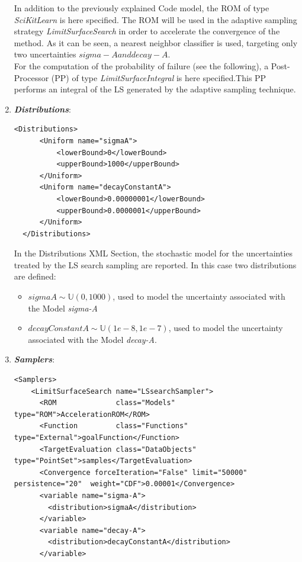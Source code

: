 \begin{enumerate}
 In addition to the previously explained Code
 model,
 the ROM of type \textit{SciKitLearn} is here specified. The ROM will be
 used in the adaptive sampling strategy \textit{LimitSurfaceSearch} in
 order to accelerate the convergence of the method. As it can be seen,
 a nearest neighbor classifier is used, targeting only two uncertainties
 $sigma-A and decay-A$.
 \\ For the computation of the probability of failure (see the following), a
 Post-Processor (PP) of type \textit{LimitSurfaceIntegral} is here
 specified.This PP performs an integral of the LS
 generated by the adaptive sampling technique.
   \item \textbf{\textit{Distributions}}:
\begin{lstlisting}[style=XML]
  <Distributions>
      <Uniform name="sigmaA">
          <lowerBound>0</lowerBound>
          <upperBound>1000</upperBound>
      </Uniform>
      <Uniform name="decayConstantA">
          <lowerBound>0.00000001</lowerBound>
          <upperBound>0.0000001</upperBound>
      </Uniform>
  </Distributions>
\end{lstlisting}
  In the Distributions XML Section, the stochastic model for the
  uncertainties  treated by the LS search sampling are reported. In
  this case two distributions are defined:
  \begin{itemize}
    \item $sigmaA \sim \mathbb{U}(0,1000)$, used to model the uncertainty
    associated with  the Model \textit{sigma-A}
    \item  $decayConstantA \sim \mathbb{U}(1e-8,1e-7)$,  used to
    model the uncertainty
    associated with  the Model \textit{decay-A}.
  \end{itemize}
   \item \textbf{\textit{Samplers}}:
\begin{lstlisting}[style=XML,morekeywords={arg,extension,pauseAtEnd,overwrite}]
  <Samplers>
    <LimitSurfaceSearch name="LSsearchSampler">
      <ROM              class="Models"      type="ROM">AccelerationROM</ROM>
      <Function         class="Functions"   type="External">goalFunction</Function>
      <TargetEvaluation class="DataObjects" type="PointSet">samples</TargetEvaluation>
      <Convergence forceIteration="False" limit="50000" persistence="20"  weight="CDF">0.00001</Convergence>
      <variable name="sigma-A">
        <distribution>sigmaA</distribution>
      </variable>
      <variable name="decay-A">
        <distribution>decayConstantA</distribution>
      </variable>

\end{lstlisting}
\end{enumerate}
